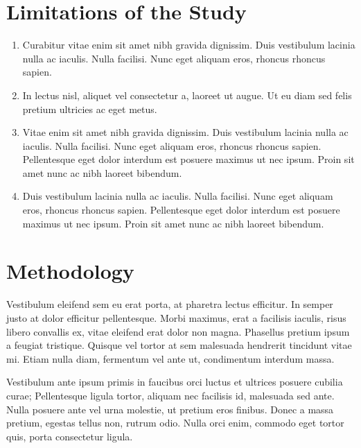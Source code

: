 
\section{Limitations of the Study}

\begin{enumerate}
	\item Curabitur vitae enim sit amet nibh gravida dignissim. Duis vestibulum lacinia nulla ac iaculis. Nulla facilisi. Nunc eget aliquam eros, rhoncus rhoncus sapien.
	\item In lectus nisl, aliquet vel consectetur a, laoreet ut augue. Ut eu diam sed felis pretium ultricies ac eget metus.
	\item Vitae enim sit amet nibh gravida dignissim. Duis vestibulum lacinia nulla ac iaculis. Nulla facilisi. Nunc eget aliquam eros, rhoncus rhoncus sapien. Pellentesque eget dolor interdum est posuere maximus ut nec ipsum. Proin sit amet nunc ac nibh laoreet bibendum.
	\item Duis vestibulum lacinia nulla ac iaculis. Nulla facilisi. Nunc eget aliquam eros, rhoncus rhoncus sapien. Pellentesque eget dolor interdum est posuere maximus ut nec ipsum. Proin sit amet nunc ac nibh laoreet bibendum.
\end{enumerate}


\section{Methodology}

Vestibulum eleifend sem eu erat porta, at pharetra lectus efficitur. In semper justo at dolor efficitur pellentesque. Morbi maximus, erat a facilisis iaculis, risus libero convallis ex, vitae eleifend erat dolor non magna. Phasellus pretium ipsum a feugiat tristique. Quisque vel tortor at sem malesuada hendrerit tincidunt vitae mi. Etiam nulla diam, fermentum vel ante ut, condimentum interdum massa. 

Vestibulum ante ipsum primis in faucibus orci luctus et ultrices posuere cubilia curae; Pellentesque ligula tortor, aliquam nec facilisis id, malesuada sed ante. Nulla posuere ante vel urna molestie, ut pretium eros finibus. Donec a massa pretium, egestas tellus non, rutrum odio. Nulla orci enim, commodo eget tortor quis, porta consectetur ligula.

